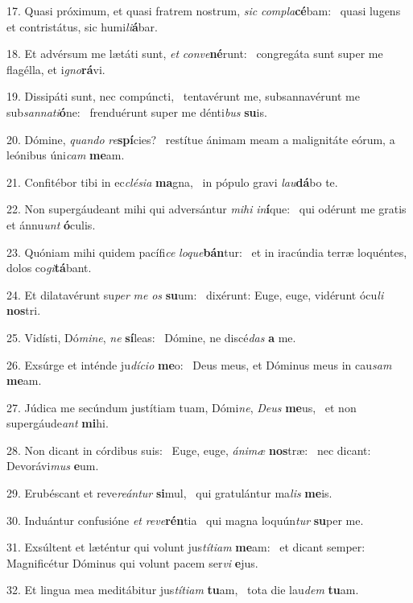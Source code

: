 17. Quasi próximum, et quasi fratrem nostrum, \textit{sic} \textit{com}\textit{pla}\textbf{cé}bam: \ast\  quasi lugens et contristátus, sic humi\textit{li}\textbf{á}bar.\

18. Et advérsum me lætáti sunt, \textit{et} \textit{con}\textit{ve}\textbf{né}runt: \ast\  congregáta sunt super me flagélla, et i\textit{gno}\textbf{rá}vi.\

19. Dissipáti sunt, nec compúncti, \dag\  tentavérunt me, subsannavérunt me sub\textit{san}\textit{na}\textit{ti}\textbf{ó}ne: \ast\  frenduérunt super me dénti\textit{bus} \textbf{su}is.\

20. Dómine, \textit{quan}\textit{do} \textit{re}\textbf{spí}cies? \ast\  restítue ánimam meam a malignitáte eórum, a leónibus úni\textit{cam} \textbf{me}am.\

21. Confitébor tibi in ec\textit{clé}\textit{si}\textit{a} \textbf{ma}gna, \ast\  in pópulo gravi \textit{lau}\textbf{dá}bo te.\

22. Non supergáudeant mihi qui adversántur \textit{mi}\textit{hi} \textit{in}\textbf{í}que: \ast\  qui odérunt me gratis et ánnu\textit{unt} \textbf{ó}culis.\

23. Quóniam mihi quidem pacífi\textit{ce} \textit{lo}\textit{que}\textbf{bán}tur: \ast\  et in iracúndia terræ loquéntes, dolos co\textit{gi}\textbf{tá}bant.\

24. Et dilatavérunt su\textit{per} \textit{me} \textit{os} \textbf{su}um: \ast\  dixérunt: Euge, euge, vidérunt ócu\textit{li} \textbf{nos}tri.\

25. Vidísti, Dó\textit{mi}\textit{ne}, \textit{ne} \textbf{sí}leas: \ast\  Dómine, ne discé\textit{das} \textbf{a} me.\

26. Exsúrge et inténde ju\textit{dí}\textit{ci}\textit{o} \textbf{me}o: \ast\  Deus meus, et Dóminus meus in cau\textit{sam} \textbf{me}am.\

27. Júdica me secúndum justítiam tuam, Dómi\textit{ne}, \textit{De}\textit{us} \textbf{me}us, \ast\  et non supergáude\textit{ant} \textbf{mi}hi.\

28. Non dicant in córdibus suis: \dag\  Euge, euge, \textit{á}\textit{ni}\textit{mæ} \textbf{nos}træ: \ast\  nec dicant: Devorávi\textit{mus} \textbf{e}um.\

29. Erubéscant et reve\textit{re}\textit{án}\textit{tur} \textbf{si}mul, \ast\  qui gratulántur ma\textit{lis} \textbf{me}is.\

30. Induántur confusióne \textit{et} \textit{re}\textit{ve}\textbf{rén}tia \ast\  qui magna loquún\textit{tur} \textbf{su}per me.\

31. Exsúltent et læténtur qui volunt jus\textit{tí}\textit{ti}\textit{am} \textbf{me}am: \ast\  et dicant semper: Magnificétur Dóminus qui volunt pacem ser\textit{vi} \textbf{e}jus.\

32. Et lingua mea meditábitur jus\textit{tí}\textit{ti}\textit{am} \textbf{tu}am, \ast\  tota die lau\textit{dem} \textbf{tu}am.\

